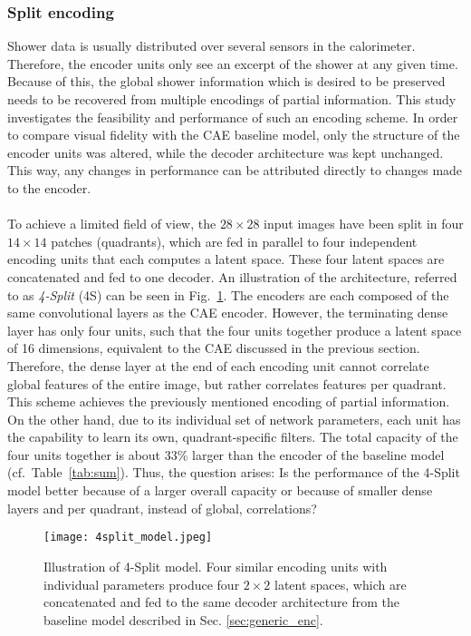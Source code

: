\documentclass[../../main.tex]{subfiles}
\begin{document}
\subsubsection{Split encoding}\label{sec:latent_concat}
Shower data is usually distributed over several sensors in the calorimeter. Therefore, the encoder units only see an excerpt of the shower at any given time. Because of this, the global shower information which is desired to be preserved needs to be recovered from multiple encodings of partial information. This study investigates the feasibility and performance of such an encoding scheme. In order to compare visual fidelity with the CAE baseline model, only the structure of the encoder units was altered, while the decoder architecture was kept unchanged. This way, any changes in performance can be attributed directly to changes made to the encoder.\\
\\
To achieve a limited field of view, the $28\times28$ input images have been split in four $14\times14$ patches (quadrants), which are fed in parallel to four independent encoding units that each computes a latent space. These four latent spaces are concatenated and fed to one decoder. An illustration of the architecture, referred to as \textit{4-Split} (4S) can be seen in Fig.~\ref{fig:4split}. The encoders are each composed of the same convolutional layers as the CAE encoder. However, the terminating dense layer has only four units, such that the four units together produce a latent space of 16 dimensions, equivalent to the CAE discussed in the previous section. Therefore, the dense layer at the end of each encoding unit cannot correlate global features of the entire image, but rather correlates features per quadrant. This scheme achieves the previously mentioned encoding of partial information. On the other hand, due to its individual set of network parameters, each unit has the capability to learn its own, quadrant-specific filters. The total capacity of the four units together is about 33\% larger than the encoder of the baseline model (cf.~Table~\ref{tab:sum}). Thus, the question arises: Is the performance of the 4-Split model better because of a larger overall capacity or because of smaller dense layers and per quadrant, instead of global, correlations?\\
\begin{figure}[htp]
			\begin{center}
				\texttt{[image: 4split\_model.jpeg]}
				\caption{Illustration of 4-Split model. Four similar encoding units with individual parameters produce four $2\times2$ latent spaces, which are concatenated and fed to the same decoder architecture from the baseline model described in Sec. \ref{sec:generic_enc}.}
				\label{fig:4split}
			\end{center}
\end{figure}
\end{document}
